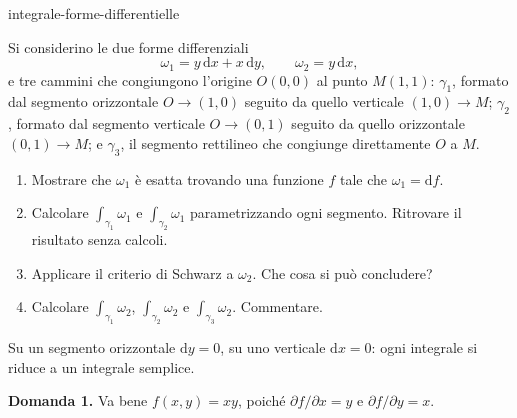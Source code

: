 
\begin{exo}{integrale-forme-differentielle}

Si considerino le due forme differenziali
\[\omega_1=y\,\mathrm{d}x+x\,\mathrm{d}y,\qquad\omega_2=y\,\mathrm{d}x,\]
e tre cammini che congiungono l'origine $O(0,0)$ al punto $M(1,1)$: $\gamma_1$,
formato dal segmento orizzontale $O\to(1,0)$ seguito da quello verticale
$(1,0)\to M$; $\gamma_2$, formato dal segmento verticale $O\to(0,1)$ seguito
da quello orizzontale $(0,1)\to M$; e $\gamma_3$, il segmento rettilineo che
congiunge direttamente $O$ a $M$.

\begin{enumerate}
\item Mostrare che $\omega_1$ è esatta trovando una funzione $f$ tale che $\omega_1=\mathrm{d}f$.
\item Calcolare $\int_{\gamma_1}\omega_1$ e $\int_{\gamma_2}\omega_1$ parametrizzando ogni segmento. Ritrovare il risultato senza calcoli.
\item Applicare il criterio di Schwarz a $\omega_2$. Che cosa si può concludere?
\item Calcolare $\int_{\gamma_1}\omega_2$, $\int_{\gamma_2}\omega_2$ e $\int_{\gamma_3}\omega_2$. Commentare.
\end{enumerate}

\begin{indication}
Su un segmento orizzontale $\mathrm{d}y=0$, su uno verticale $\mathrm{d}x=0$:
ogni integrale si riduce a un integrale semplice.
\end{indication}

\begin{solution}
\textbf{Domanda 1.} Va bene $f(x,y)=xy$, poiché $\partial f/\partial x=y$ e $\partial f/\partial y=x$.


\end{solution}
\end{exo}
